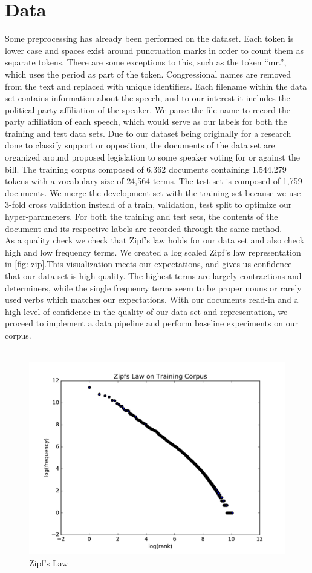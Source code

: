 \documentclass[a4paper, 12pt]{article}
\begin{document}
\section{Data}
Some preprocessing has already been performed on the dataset. Each token is lower case and spaces exist around punctuation marks in order to count them as separate tokens. There are some exceptions to this, such as the token ``mr.'', which uses the period as part of the token. Congressional names are removed from the text and replaced with unique identifiers. Each filename within the data set contains information about the speech, and to our interest it includes the political party affiliation of the speaker. We parse the file name to record the party affiliation of each speech, which would serve as our labels for both the training and test data sets. Due to our dataset being originally for a research done to classify support or opposition, the documents of the data set are organized around proposed legislation to some speaker voting for or against the bill. The training corpus composed of 6,362 documents containing 1,544,279 tokens with a vocabulary size of 24,564 terms. The test set is composed of 1,759 documents. We merge the development set with the training set because we use 3-fold cross validation instead of a train, validation, test split to optimize our hyper-parameters. For both the training and test sets, the contents of the document and its respective labels are recorded through the same method.\\ 

\noindent
As a quality check we check that  Zipf's law holds for our data set and also check high and low frequency terms. We created a log scaled Zipf's law representation in \autoref{fig: zip}.This visualization meets our expectations, and gives us confidence that our data set is high quality. The highest terms are largely contractions and determiners, while the single frequency terms seem to be proper nouns or rarely used verbs which matches our expectations. With our documents read-in and a high level of confidence in the quality of our data set and representation, we proceed to implement a data pipeline and perform baseline experiments on our corpus.\\\
\begin{figure}[!ht]
\centering
\includegraphics[width=0.5\linewidth]{zipfslaw.pdf}
\caption[Zipf's Law]{Zipf's Law}
\label{fig: zip}
\end{figure}
\end{document}
